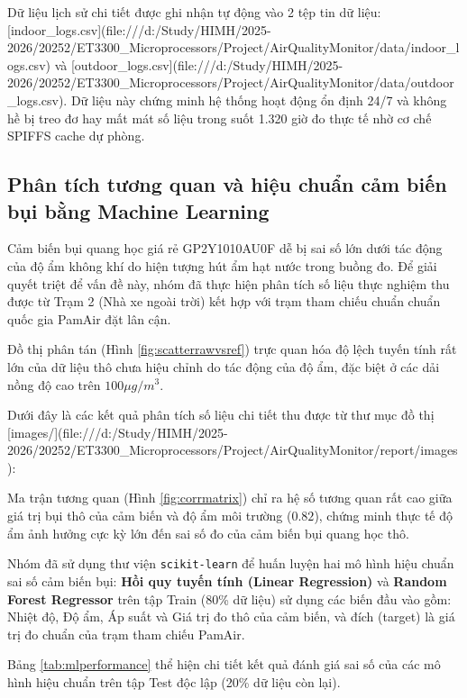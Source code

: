 Dữ liệu lịch sử chi tiết được ghi nhận tự động vào 2 tệp tin dữ liệu: [indoor\_logs.csv](file:///d:/Study/HIMH/2025-2026/20252/ET3300\_Microprocessors/Project/AirQualityMonitor/data/indoor\_logs.csv) và [outdoor\_logs.csv](file:///d:/Study/HIMH/2025-2026/20252/ET3300\_Microprocessors/Project/AirQualityMonitor/data/outdoor\_logs.csv). Dữ liệu này chứng minh hệ thống hoạt động ổn định 24/7 và không hề bị treo đơ hay mất mát số liệu trong suốt 1.320 giờ đo thực tế nhờ cơ chế SPIFFS cache dự phòng.

\subsection{Phân tích tương quan và hiệu chuẩn cảm biến bụi bằng Machine Learning}
Cảm biến bụi quang học giá rẻ GP2Y1010AU0F dễ bị sai số lớn dưới tác động của độ ẩm không khí do hiện tượng hút ẩm hạt nước trong buồng đo. Để giải quyết triệt để vấn đề này, nhóm đã thực hiện phân tích số liệu thực nghiệm thu được từ Trạm 2 (Nhà xe ngoài trời) kết hợp với trạm tham chiếu chuẩn chuẩn quốc gia PamAir đặt lân cận.

Đồ thị phân tán (Hình \ref{fig:scatterrawvsref}) trực quan hóa độ lệch tuyến tính rất lớn của dữ liệu thô chưa hiệu chỉnh do tác động của độ ẩm, đặc biệt ở các dải nồng độ cao trên $100 \mu g/m^3$.

Dưới đây là các kết quả phân tích số liệu chi tiết thu được từ thư mục đồ thị [images/](file:///d:/Study/HIMH/2025-2026/20252/ET3300\_Microprocessors/Project/AirQualityMonitor/report/images):

Ma trận tương quan (Hình \ref{fig:corrmatrix}) chỉ ra hệ số tương quan rất cao giữa giá trị bụi thô của cảm biến và độ ẩm môi trường ($0.82$), chứng minh thực tế độ ẩm ảnh hưởng cực kỳ lớn đến sai số đo của cảm biến bụi quang học thô.

Nhóm đã sử dụng thư viện \texttt{scikit-learn} để huấn luyện hai mô hình hiệu chuẩn sai số cảm biến bụi: \textbf{Hồi quy tuyến tính (Linear Regression)} và \textbf{Random Forest Regressor} trên tập Train (80\% dữ liệu) sử dụng các biến đầu vào gồm: Nhiệt độ, Độ ẩm, Áp suất và Giá trị đo thô của cảm biến, và đích (target) là giá trị đo chuẩn của trạm tham chiếu PamAir. 

Bảng \ref{tab:mlperformance} thể hiện chi tiết kết quả đánh giá sai số của các mô hình hiệu chuẩn trên tập Test độc lập (20\% dữ liệu còn lại).

